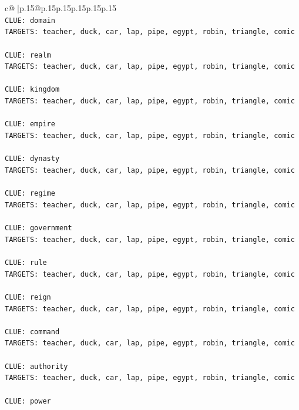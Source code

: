 \documentclass{article}
\begin{document}
{\begin{supertabular}{c@{$\;$}|p{.15\linewidth}@{}p{.15\linewidth}p{.15\linewidth}p{.15\linewidth}p{.15\linewidth}p{.15\linewidth}}
{{{\\ 
\texttt{CLUE: domain} \\
\texttt{TARGETS: teacher, duck, car, lap, pipe, egypt, robin, triangle, comic} \\
\\ 
\texttt{CLUE: realm} \\
\texttt{TARGETS: teacher, duck, car, lap, pipe, egypt, robin, triangle, comic} \\
\\ 
\texttt{CLUE: kingdom} \\
\texttt{TARGETS: teacher, duck, car, lap, pipe, egypt, robin, triangle, comic} \\
\\ 
\texttt{CLUE: empire} \\
\texttt{TARGETS: teacher, duck, car, lap, pipe, egypt, robin, triangle, comic} \\
\\ 
\texttt{CLUE: dynasty} \\
\texttt{TARGETS: teacher, duck, car, lap, pipe, egypt, robin, triangle, comic} \\
\\ 
\texttt{CLUE: regime} \\
\texttt{TARGETS: teacher, duck, car, lap, pipe, egypt, robin, triangle, comic} \\
\\ 
\texttt{CLUE: government} \\
\texttt{TARGETS: teacher, duck, car, lap, pipe, egypt, robin, triangle, comic} \\
\\ 
\texttt{CLUE: rule} \\
\texttt{TARGETS: teacher, duck, car, lap, pipe, egypt, robin, triangle, comic} \\
\\ 
\texttt{CLUE: reign} \\
\texttt{TARGETS: teacher, duck, car, lap, pipe, egypt, robin, triangle, comic} \\
\\ 
\texttt{CLUE: command} \\
\texttt{TARGETS: teacher, duck, car, lap, pipe, egypt, robin, triangle, comic} \\
\\ 
\texttt{CLUE: authority} \\
\texttt{TARGETS: teacher, duck, car, lap, pipe, egypt, robin, triangle, comic} \\
\\ 
\texttt{CLUE: power} \\
}}}
\end{supertabular}}
\end{document}
